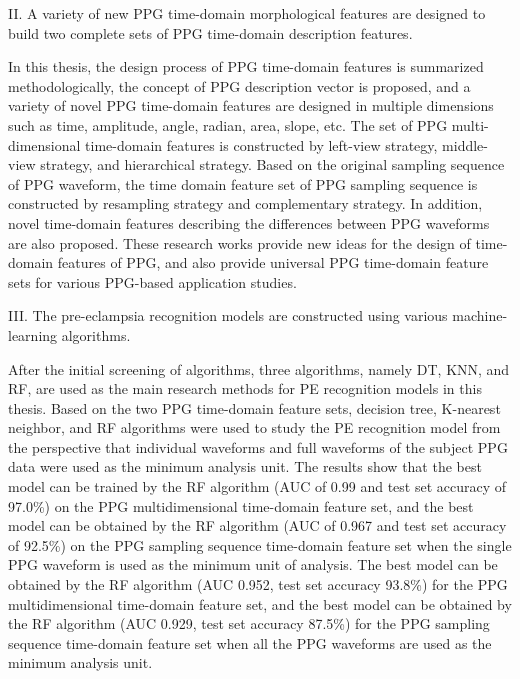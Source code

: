 II. A variety of new PPG time-domain morphological features are designed to build two complete sets of PPG time-domain description features.

In this thesis, the design process of PPG time-domain features is summarized methodologically, the concept of PPG description vector is proposed, 
and a variety of novel PPG time-domain features are designed in multiple dimensions such as time, amplitude, angle, radian, area, slope, etc. 
The set of PPG multi-dimensional time-domain features is constructed by left-view strategy, middle-view strategy, and hierarchical strategy. 
Based on the original sampling sequence of PPG waveform, the time domain feature set of PPG sampling sequence is constructed by resampling strategy and 
complementary strategy. In addition, novel time-domain features describing the differences between PPG waveforms are also proposed. 
These research works provide new ideas for the design of time-domain features of PPG, and also provide universal PPG time-domain feature sets for various PPG-based application studies.

III. The pre-eclampsia recognition models are constructed using various machine-learning algorithms.

After the initial screening of algorithms, three algorithms, namely DT, KNN, and RF, are used as the main research methods 
for PE recognition models in this thesis. Based on the two PPG time-domain feature sets, decision tree, K-nearest neighbor, and RF algorithms were 
used to study the PE recognition model from the perspective that individual waveforms and full waveforms of the subject PPG data were used as the minimum analysis unit. 
The results show that the best model can be trained by the RF algorithm (AUC of 0.99 and test set accuracy of 97.0\%) on the PPG multidimensional time-domain 
feature set, and the best model can be obtained by the RF algorithm (AUC of 0.967 and test set accuracy of 92.5\%) on the PPG sampling sequence time-domain 
feature set when the single PPG waveform is used as the minimum unit of analysis. The best model can be obtained by the RF algorithm (AUC 0.952, 
test set accuracy 93.8\%) for the PPG multidimensional time-domain feature set, and the best model can be obtained by the RF algorithm (AUC 0.929, 
test set accuracy 87.5\%) for the PPG sampling sequence time-domain feature set when all the PPG waveforms are used as the minimum analysis unit.

